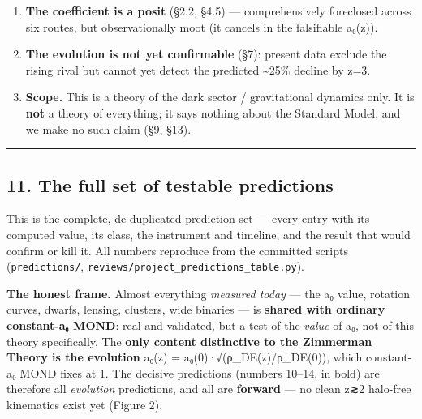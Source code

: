 \documentclass[
]{article}
\begin{document}
\begin{enumerate}
  Sitter/DSSYK dictionary (§4.4), via a \emph{computed} matter-chord
  kernel that also predicts the cluster failure. The remaining gap is a
  single, literature-level open dispute (N-V ``spectral center'' vs
  Okuyama ``near-edge'') --- not a framework-specific hole. Stronger
  than the prior ``half-forced,'' weaker than a theorem.
\item
  \textbf{The coefficient is a posit} (§2.2, §4.5) --- comprehensively
  foreclosed across six routes, but observationally moot (it cancels in
  the falsifiable a₀(z)).
\item
  \textbf{The evolution is not yet confirmable} (§7): present data
  exclude the rising rival but cannot yet detect the predicted
  \textasciitilde25\% decline by z=3.
\item
  \textbf{Scope.} This is a theory of the dark sector / gravitational
  dynamics only. It is \textbf{not} a theory of everything; it says
  nothing about the Standard Model, and we make no such claim (§9, §13).
\end{enumerate}

\begin{center}\rule{0.5\linewidth}{0.5pt}\end{center}

\subsection{11. The full set of testable
predictions}\label{the-full-set-of-testable-predictions}

This is the complete, de-duplicated prediction set --- every entry with
its computed value, its class, the instrument and timeline, and the
result that would confirm or kill it. All numbers reproduce from the
committed scripts (\texttt{predictions/},
\texttt{reviews/project\_predictions\_table.py}).

\textbf{The honest frame.} Almost everything \emph{measured today} ---
the a₀ value, rotation curves, dwarfs, lensing, clusters, wide binaries
--- is \textbf{shared with ordinary constant-a₀ MOND}: real and
validated, but a test of the \emph{value} of a₀, not of this theory
specifically. The \textbf{only content distinctive to the Zimmerman
Theory is the evolution} a₀(z) = a₀(0)·√(ρ\_DE(z)/ρ\_DE(0)), which
constant-a₀ MOND fixes at 1. The decisive predictions (numbers 10--14,
in bold) are therefore all \emph{evolution} predictions, and all are
\textbf{forward} --- no clean z≳2 halo-free kinematics exist yet (Figure
2).
\end{document}
